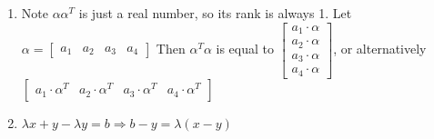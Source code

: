 \documentclass[10pt,english]{article}
\begin{document}
\begin{enumerate}
\begin{enumerate}
    
    
    \item Note $\alpha\alpha^T$ is just a real number, so its rank is always 1. Let $\alpha=\begin{bmatrix}a_1&a_2&a_3&a_4\end{bmatrix}$ Then $\alpha^T\alpha$ is equal to $\begin{bmatrix}a_1\cdot\alpha\\a_2\cdot\alpha\\a_3\cdot\alpha\\a_4\cdot\alpha\end{bmatrix}$, or alternatively $\begin{bmatrix}a_1\cdot\alpha^T&a_2\cdot\alpha^T&a_3\cdot\alpha^T&a_4\cdot\alpha^T\end{bmatrix}$
    
    
    
    \item $\lambda x+y-\lambda y=b\Rightarrow b-y=\lambda(x-y)$
    
    
\end{enumerate}
\end{enumerate}
\end{document}
